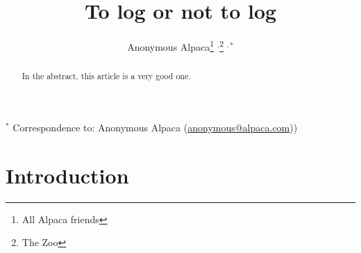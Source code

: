 \documentclass{article}
\begin{document}
\title{To log or not to log}
  \author{Anonymous Alpaca\thanks{All Alpaca friends} $^{,}$\thanks{The Zoo} $^{ , *}$}

\maketitle

\tableofcontents

\begin{abstract}
In the abstract, this article is a very good one. 
\end{abstract}

\bigskip

{\footnotesize $^*$ Correspondence to: Anonymous Alpaca (\url{anonymous@alpaca.com}))}



\newpage



%
%
    

\section{Introduction}
\end{document}
